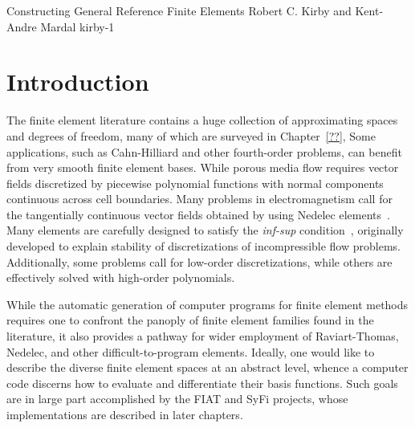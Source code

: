 \newcommand{\mathbfx}[1]{{\mbox{\boldmath $#1$}}}
\renewcommand{\P}{{\mathbb P}}
\renewcommand{\H}{{\mathbb H}}
\newcommand{\GG}{\mathbf{G}}
\newcommand{\kentc}[1]{\marginpar{\tiny KAM: #1}}
\newcommand{\rckc}[1]{\marginpar{\tiny RCK: #1}}

              {Constructing General Reference Finite Elements}
              {Robert C. Kirby and Kent-Andre Mardal}
              {kirby-1}

%




\section{Introduction}
The finite element literature contains a huge collection of
approximating spaces and degrees of freedom, many of which are
surveyed in Chapter~\ref{??}, 
Some applications, such as Cahn-Hilliard and
other fourth-order problems, can benefit from very smooth finite
element bases.  While porous media flow requires
vector fields discretized by piecewise polynomial functions with
normal components continuous across cell boundaries.  Many problems in 
electromagnetism call for the tangentially continuous vector fields obtained
by using Nedelec elements~\cite{Nedelec80,Nedelec86}.  Many elements are carefully designed
to satisfy the \emph{inf-sup} condition~\cite{BrezziFortin91,GiraultRaviart86},
originally developed to explain stability of discretizations of 
incompressible flow problems.  Additionally, some problems call for low-order
discretizations, while others are effectively solved with high-order
polynomials. 

While the automatic generation of computer programs for finite element
methods requires one to confront the panoply of  finite
element families found in the literature, it also provides a pathway
for wider employment of Raviart-Thomas, Nedelec, and other
difficult-to-program elements.  
Ideally, one would like to
describe the diverse finite element spaces at an abstract level,
whence a computer code discerns how to evaluate and differentiate
their basis functions.  Such goals are in large part accomplished by
the FIAT and SyFi projects, whose implementations are described in
later chapters.  

